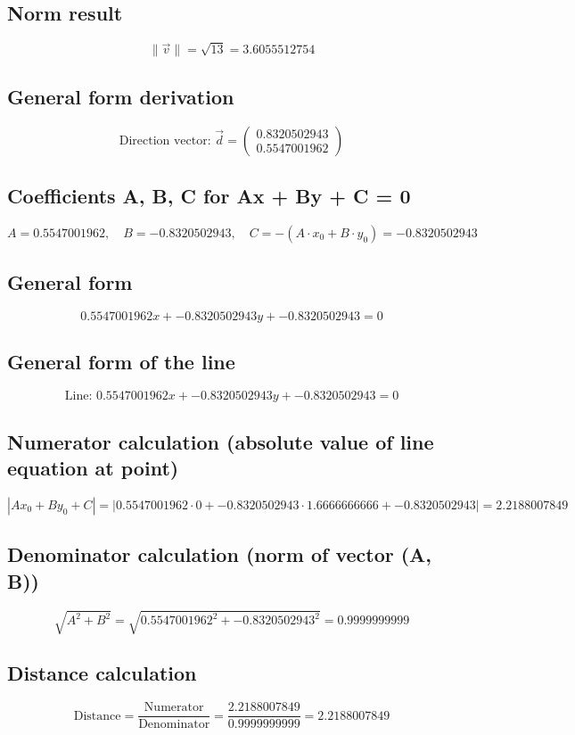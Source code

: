 \documentclass{article}
\begin{document}
\subsection*{ \vspace{1em} Norm result}
\[
\|\vec{v}\| = \sqrt{13} = 3.6055512754
\]
\subsection*{ \vspace{1em} General form derivation}
\[
\text{Direction vector: } \vec{d} = \begin{pmatrix}0.8320502943 \\ 0.5547001962\end{pmatrix}
\]
\subsection*{ \vspace{1em} Coefficients A, B, C for Ax + By + C = 0}
\[
A = 0.5547001962,\quad B = -0.8320502943,\quad C = - (A \cdot x_0 + B \cdot y_0) = -0.8320502943
\]
\subsection*{ \vspace{1em} General form}
\[
0.5547001962x + -0.8320502943y + -0.8320502943 = 0
\]
\subsection*{ \vspace{1em} General form of the line}
\[
\text{Line: } 0.5547001962x + -0.8320502943y + -0.8320502943 = 0
\]
\subsection*{ \vspace{1em} Numerator calculation (absolute value of line equation at point)}
\[
\left| A x_0 + B y_0 + C \right| = \left| 0.5547001962 \cdot 0 + -0.8320502943 \cdot 1.6666666666 + -0.8320502943 \right| = 2.2188007849
\]
\subsection*{ \vspace{1em} Denominator calculation (norm of vector (A, B))}
\[
\sqrt{A^2 + B^2} = \sqrt{0.5547001962^2 + -0.8320502943^2} = 0.9999999999
\]
\subsection*{ \vspace{1em} Distance calculation}
\[
\text{Distance} = \frac{\text{Numerator}}{\text{Denominator}} = \frac{2.2188007849}{0.9999999999} = 2.2188007849
\]
\end{document}
